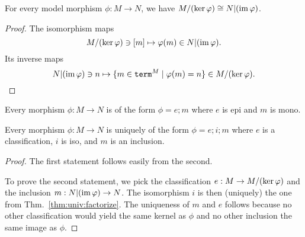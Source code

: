 \begin{theorem}\label{thm:univ:factorize}
For every model morphism $\phi:M\to N$, we have $M/(\mathrm{ker}\, \varphi)\cong N|(\mathrm{im}\, \varphi)$.
\end{theorem}
\begin{proof}
The isomorphism maps \[M/(\mathrm{ker}\, \varphi) \ni[m] \mapsto \varphi(m) \in  N|(\mathrm{im}\, \varphi).\]
Its inverse maps \[N|(\mathrm{im}\, \varphi)\ni n \mapsto \{m\in\mathtt{term}^M\;|\;\varphi(m)=n\}\in M/(\mathrm{ker}\, \varphi).\]
\end{proof}

\begin{theorem}\label{thm:univ:factorize2}
Every morphism $\phi:M\to N$ is of the form $\phi=e;m$ where $e$ is epi and $m$ is mono.

Every morphism $\phi:M\to N$ is uniquely of the form $\phi=e;i;m$ where $e$ is a classification, $i$ is iso, and $m$ is an inclusion.
\end{theorem}
\begin{proof}
The first statement follows easily from the second.

To prove the second statement, we pick the classification $e:M\to M/(\mathrm{ker}\, \varphi)$ and the inclusion $m:N|(\mathrm{im}\, \varphi)\to N$.
The isomorphism $i$ is then (uniquely) the one from Thm.~\ref{thm:univ:factorize}.
The uniqueness of $m$ and $e$ follows because no other classification would yield the same kernel as $\phi$ and no other inclusion the same image as $\phi$.
\end{proof}